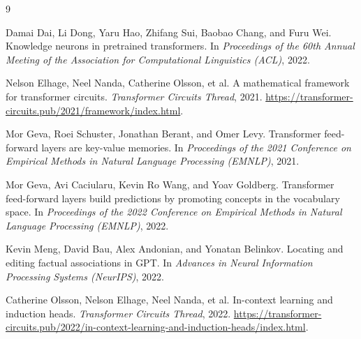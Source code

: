 \documentclass[11pt]{article}
\begin{document}

\begin{thebibliography}{9}

Damai Dai, Li Dong, Yaru Hao, Zhifang Sui, Baobao Chang, and Furu Wei.
\newblock Knowledge neurons in pretrained transformers.
\newblock In \emph{Proceedings of the 60th Annual Meeting of the Association
for Computational Linguistics (ACL)}, 2022.

Nelson Elhage, Neel Nanda, Catherine Olsson, et al.
\newblock A mathematical framework for transformer circuits.
\newblock \emph{Transformer Circuits Thread}, 2021.
\newblock \url{https://transformer-circuits.pub/2021/framework/index.html}.

Mor Geva, Roei Schuster, Jonathan Berant, and Omer Levy.
\newblock Transformer feed-forward layers are key-value memories.
\newblock In \emph{Proceedings of the 2021 Conference on Empirical Methods in
Natural Language Processing (EMNLP)}, 2021.

Mor Geva, Avi Caciularu, Kevin Ro Wang, and Yoav Goldberg.
\newblock Transformer feed-forward layers build predictions by promoting
concepts in the vocabulary space.
\newblock In \emph{Proceedings of the 2022 Conference on Empirical Methods in
Natural Language Processing (EMNLP)}, 2022.

Kevin Meng, David Bau, Alex Andonian, and Yonatan Belinkov.
\newblock Locating and editing factual associations in GPT.
\newblock In \emph{Advances in Neural Information Processing Systems (NeurIPS)},
2022.

Catherine Olsson, Nelson Elhage, Neel Nanda, et al.
\newblock In-context learning and induction heads.
\newblock \emph{Transformer Circuits Thread}, 2022.
\newblock \url{https://transformer-circuits.pub/2022/in-context-learning-and-induction-heads/index.html}.

\end{thebibliography}
\end{document}
